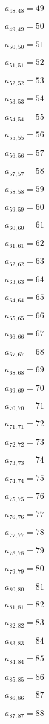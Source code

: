 \documentclass[a4paper,12pt]{article}
\begin{document}
$a _{ 48, 48 } = 49$

$a _{ 49, 49 } = 50$

$a _{ 50, 50 } = 51$

$a _{ 51, 51 } = 52$

$a _{ 52, 52 } = 53$

$a _{ 53, 53 } = 54$

$a _{ 54, 54 } = 55$

$a _{ 55, 55 } = 56$

$a _{ 56, 56 } = 57$

$a _{ 57, 57 } = 58$

$a _{ 58, 58 } = 59$

$a _{ 59, 59 } = 60$

$a _{ 60, 60 } = 61$

$a _{ 61, 61 } = 62$

$a _{ 62, 62 } = 63$

$a _{ 63, 63 } = 64$

$a _{ 64, 64 } = 65$

$a _{ 65, 65 } = 66$

$a _{ 66, 66 } = 67$

$a _{ 67, 67 } = 68$

$a _{ 68, 68 } = 69$

$a _{ 69, 69 } = 70$

$a _{ 70, 70 } = 71$

$a _{ 71, 71 } = 72$

$a _{ 72, 72 } = 73$

$a _{ 73, 73 } = 74$

$a _{ 74, 74 } = 75$

$a _{ 75, 75 } = 76$

$a _{ 76, 76 } = 77$

$a _{ 77, 77 } = 78$

$a _{ 78, 78 } = 79$

$a _{ 79, 79 } = 80$

$a _{ 80, 80 } = 81$

$a _{ 81, 81 } = 82$

$a _{ 82, 82 } = 83$

$a _{ 83, 83 } = 84$

$a _{ 84, 84 } = 85$

$a _{ 85, 85 } = 86$

$a _{ 86, 86 } = 87$

$a _{ 87, 87 } = 88$
\end{document}
